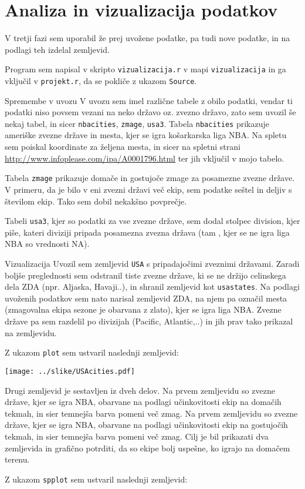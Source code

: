 \documentclass[11pt,a4paper]{article}
\begin{document}




\section{Analiza in vizualizacija podatkov}

V tretji fazi sem uporabil že prej uvožene podatke, pa tudi nove podatke, in na podlagi teh izdelal zemljevid.

Program sem napisal v skripto \verb|vizualizacija.r| v mapi \verb|vizualizacija| in ga vključil v \verb|projekt.r|, da se pokliče z ukazom \verb|Source|.

Spremembe v uvozu
V uvozu sem imel različne tabele z obilo podatki, vendar ti podatki niso povsem vezani na neko državo oz. zvezno državo, zato sem uvozil še nekaj tabel, in sicer \verb|nbacities|, \verb|zmage|,
\verb|usa3|. Tabela \verb|nbacities| prikazuje ameriške zvezne države in mesta, kjer se igra košarkarska liga NBA. Na spletu sem poiskal koordinate za željena mesta, in sicer na spletni strani \url{http://www.infoplease.com/ipa/A0001796.html} ter jih vključil v mojo tabelo. 

Tabela \verb|zmage| prikazuje domače in gostujoče zmage za posamezne zvezne države. V primeru, da je bilo v eni zvezni državi več ekip, sem podatke seštel in deljiv s številom ekip. Tako sem dobil nekakšno povprečje.

Tabeli \verb|usa3|, kjer so podatki za vse zvezne države, sem dodal stolpec division, kjer piše, kateri diviziji pripada posamezna zvezna država (tam , kjer se ne igra liga NBA so vrednosti NA).

Vizualizacija
Uvozil sem zemljevid \verb|USA| s pripadajočimi zveznimi državami. Zaradi boljše preglednosti sem odstranil tiste zvezne države, ki se ne držijo celinskega dela ZDA (npr. Aljaska, Havaji..), in shranil zemljevid kot \verb|usastates|. Na podlagi uvoženih podatkov sem nato narisal zemljevid ZDA, na njem pa označil mesta (zmagovalna ekipa sezone je obarvana z zlato), kjer se igra liga NBA. Zvezne države pa sem razdelil po divizijah (Pacific, Atlantic,..) in jih prav tako prikazal na zemljevidu.

Z ukazom \verb|plot| sem ustvaril naslednji zemljevid:

\texttt{[image: ../slike/USAcities.pdf]}

Drugi zemljevid je sestavljen iz dveh delov. 
Na prvem zemljevidu so zvezne države, kjer se igra NBA, obarvane na podlagi učinkovitosti ekip na domačih tekmah, in sier temnejša barva pomeni več zmag.
Na prvem zemljevidu so zvezne države, kjer se igra NBA, obarvane na podlagi učinkovitosti ekip na gostujočih tekmah, in sier temnejša barva pomeni več zmag.
Cilj je bil prikazati dva zemljevida in grafično potrditi, da so ekipe bolj uspešne, ko igrajo na domačem terenu.

Z ukazom \verb|spplot| sem ustvaril naslednji zemljevid:


% 
\end{document}
